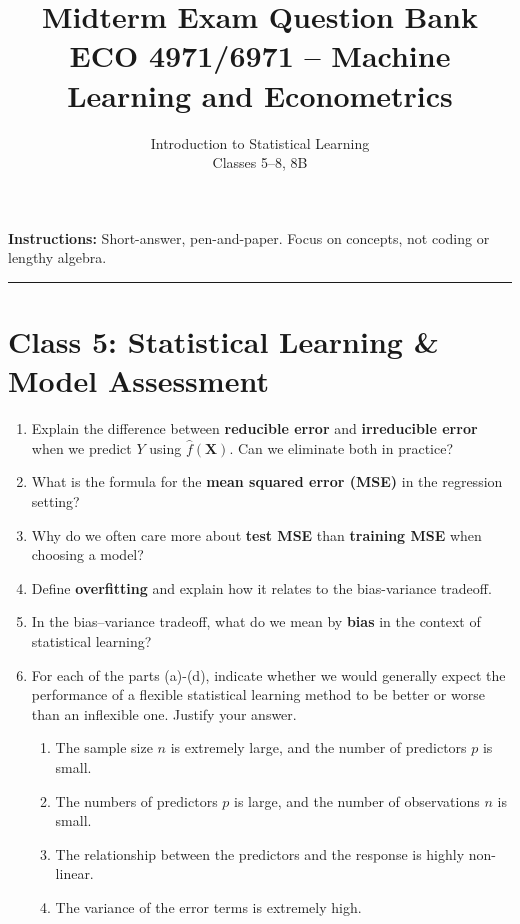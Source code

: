 \documentclass[11pt]{article}
\title{Midterm Exam Question Bank\\[0.5em]
  \large ECO 4971/6971 -- Machine Learning and Econometrics}
\author{Introduction to Statistical Learning\\Classes 5--8, 8B}
\date{}
\begin{document}
\maketitle
\noindent \textbf{Instructions:} Short-answer, pen-and-paper. Focus on concepts, not coding or lengthy algebra.

\bigskip
\hrule
\bigskip

\section*{Class 5: Statistical Learning \& Model Assessment}

\begin{enumerate}[leftmargin=*]

\item Explain the difference between \textbf{reducible error} and \textbf{irreducible error} when we predict $Y$ using $\hat{f}(\mathbf{X})$. Can we eliminate both in practice?

\item What is the formula for the \textbf{mean squared error (MSE)} in the regression setting? 

\item Why do we often care more about \textbf{test MSE} than \textbf{training MSE} when choosing a model?

\item Define \textbf{overfitting} and explain how it relates to the bias-variance tradeoff.

\item In the bias--variance tradeoff, what do we mean by \textbf{bias} in the context of statistical learning? 

\item For each of the parts (a)-(d), indicate whether we would generally expect the performance of a flexible statistical learning method to be better or worse than an inflexible one. Justify your answer. 
\begin{enumerate}[label=(\alph*)]
  \item The sample size $n$ is extremely large, and the number of predictors $p$ is small.
  \item The numbers of predictors $p$ is large, and the number of observations $n$ is small.
\item The relationship between the predictors and the response is highly non-linear.
\item The variance of the error terms is extremely high.
\end{enumerate}


\end{enumerate}
\end{document}
